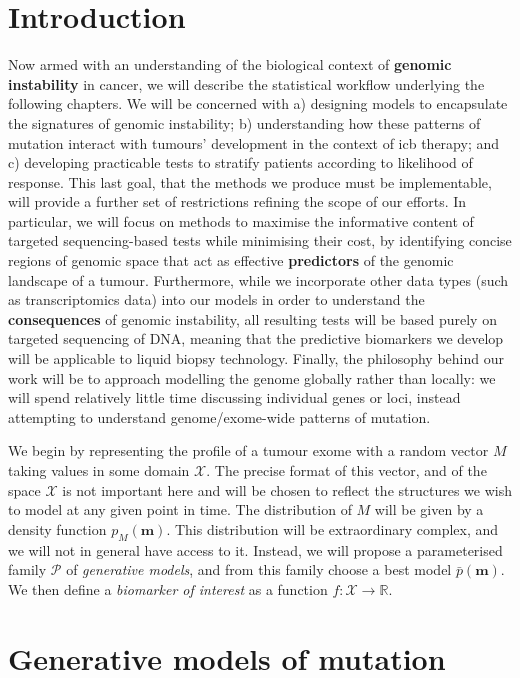 \documentclass[../thesis.tex]{subfiles}
\begin{document}
\section{Introduction}
Now armed with an understanding of the biological context of \textbf{genomic instability} in cancer, we will describe the statistical workflow underlying the following chapters. We will be concerned with a) designing models to encapsulate the signatures of genomic instability; b) understanding how these patterns of mutation interact with tumours' development in the context of \gls{icb} therapy; and c) developing practicable tests to stratify patients according to likelihood of response. This last goal, that the methods we produce must be implementable, will provide a further set of restrictions refining the scope of our efforts. In particular, we will focus on methods to maximise the informative content of targeted sequencing-based tests while minimising their cost, by identifying concise regions of genomic space that act as effective \textbf{predictors} of the genomic landscape of a tumour. Furthermore, while we incorporate other data types (such as transcriptomics data) into our models in order to understand the \textbf{consequences} of genomic instability, all resulting tests will be based purely on targeted sequencing of DNA, meaning that the predictive biomarkers we develop will be applicable to liquid biopsy technology. Finally, the philosophy behind our work will be to approach modelling the genome globally rather than locally: we will spend relatively little time discussing individual genes or loci, instead attempting to understand genome/exome-wide patterns of mutation.

We begin by representing the profile of a tumour exome with a random vector $M$ taking values in some domain $\mathcal{X}$. The precise format of this vector, and of the space $\mathcal{X}$ is not important here and will be chosen to reflect the structures we wish to model at any given point in time. The distribution of $M$ will be given by a density function $p_M(\mathbf{m})$. This distribution will be extraordinary complex, and we will not in general have access to it. Instead, we will propose a parameterised family $\mathcal{P}$ of \emph{generative models}, and from this family choose a best model $\bar{p}(\mathbf{m})$. We then define a \emph{biomarker of interest} as a function $f: \mathcal{X} \rightarrow \mathbb{R}$. 


\section{Generative models of mutation}
\end{document}
